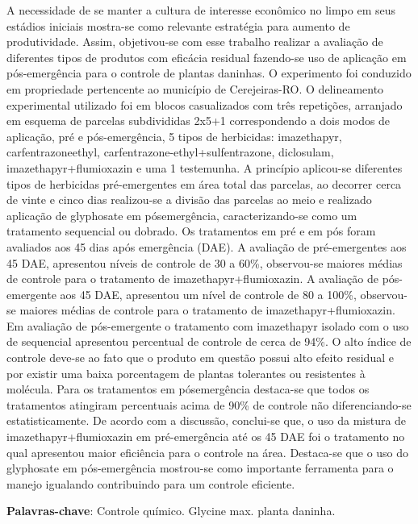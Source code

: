\documentclass[article,12pt,onesidea,4paper,english,brazil]{abntex2}
\begin{document}
	\noindent A necessidade de se manter a cultura de interesse econômico no limpo em seus
	estádios iniciais mostra-se como relevante estratégia para aumento de
	produtividade. Assim, objetivou-se com esse trabalho realizar a avaliação de
	diferentes tipos de produtos com eficácia residual fazendo-se uso de aplicação em
	pós-emergência para o controle de plantas daninhas. O experimento foi conduzido
	em propriedade pertencente ao município de Cerejeiras-RO. O delineamento
	experimental utilizado foi em blocos casualizados com três repetições, arranjado em
	esquema de parcelas subdivididas 2x5+1 correspondendo a dois modos de
	aplicação, pré e pós-emergência, 5 tipos de herbicidas: imazethapyr, carfentrazoneethyl,
	carfentrazone-ethyl+sulfentrazone, diclosulam, imazethapyr+flumioxazin e uma
	1 testemunha. A princípio aplicou-se diferentes tipos de herbicidas pré-emergentes
	em área total das parcelas, ao decorrer cerca de vinte e cinco dias realizou-se a
	divisão das parcelas ao meio e realizado aplicação de glyphosate em pósemergência,
	caracterizando-se como um tratamento sequencial ou dobrado. Os
	tratamentos em pré e em pós foram avaliados aos 45 dias após emergência (DAE).
	A avaliação de pré-emergentes aos 45 DAE, apresentou níveis de controle de 30 a
	60\%, observou-se maiores médias de controle para o tratamento de
	imazethapyr+flumioxazin. A avaliação de pós-emergente aos 45 DAE, apresentou
	um nível de controle de 80 a 100\%, observou-se maiores médias de controle para o
	tratamento de imazethapyr+flumioxazin. Em avaliação de pós-emergente o
	tratamento com imazethapyr isolado com o uso de sequencial apresentou percentual
	de controle de cerca de 94\%. O alto índice de controle deve-se ao fato que o produto
	em questão possui alto efeito residual e por existir uma baixa porcentagem de
	plantas tolerantes ou resistentes à molécula. Para os tratamentos em pósemergência
	destaca-se que todos os tratamentos atingiram percentuais acima de
	90\% de controle não diferenciando-se estatisticamente. De acordo com a discussão,
	conclui-se que, o uso da mistura de imazethapyr+flumioxazin em pré-emergência até
	os 45 DAE foi o tratamento no qual apresentou maior eficiência para o controle na
	área. Destaca-se que o uso do glyphosate em pós-emergência mostrou-se como
	importante ferramenta para o manejo igualando contribuindo para um controle
	eficiente.
	
	\vspace{\onelineskip}
	
	\noindent
	\textbf{Palavras-chave}: Controle químico. Glycine max. planta daninha.
	
\end{document}
